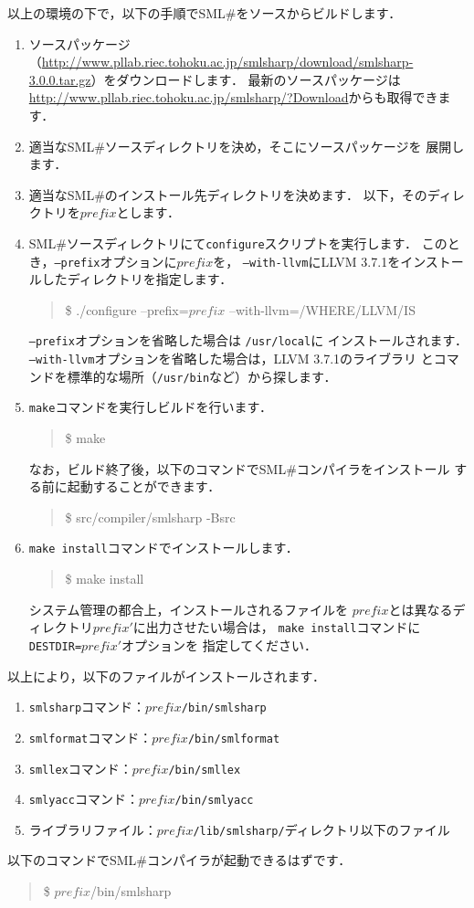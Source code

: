 \documentclass{jbook}
\newcommand{\smlsharp}{SML\#}
\newcommand{\version}{3.0.0}
\newcommand\eurl[1]{{\edef\eurlTMP{{#1}}\expandafter\url\eurlTMP}}
\newenvironment{program}{\begin{quote}\begin{tt}}%
                        {\end{tt}\end{quote}}
\begin{document}
	以上の環境の下で，以下の手順で\smlsharp{}をソースからビルドします．
\begin{enumerate}
\item
	ソースパッケージ（\eurl{http://www.pllab.riec.tohoku.ac.jp/smlsharp/download/smlsharp-\version.tar.gz}）をダウンロードします．
	最新のソースパッケージは
\url{http://www.pllab.riec.tohoku.ac.jp/smlsharp/?Download}からも取得できます．
\item 適当な\smlsharp{}ソースディレクトリを決め，そこにソースパッケージを
展開します．
\item 適当な\smlsharp{}のインストール先ディレクトリを決めます．
	以下，そのディレクトリを$\mathit{prefix}$とします．
\item
	\smlsharp{}ソースディレクトリにて{\tt configure}スクリプトを実行します．
	このとき，{\tt --prefix}オプションに$\mathit{prefix}$を，
{\tt --with-llvm}にLLVM 3.7.1をインストールしたディレクトリを指定します．
\begin{program}
\$ ./configure --prefix=$\mathit{prefix}$ --with-llvm=/WHERE/LLVM/IS
\end{program}
	{\tt --prefix}オプションを省略した場合は {\tt /usr/local}に
インストールされます．
	{\tt --with-llvm}オプションを省略した場合は，LLVM 3.7.1のライブラリ
とコマンドを標準的な場所（{\tt /usr/bin}など）から探します．
\item
	{\tt make}コマンドを実行しビルドを行います．
\begin{program}
\$ make
\end{program}
	なお，ビルド終了後，以下のコマンドで\smlsharp{}コンパイラをインストール
する前に起動することができます．
\begin{program}
\$ src/compiler/smlsharp -Bsrc
\end{program}
\item
	{\tt make install}コマンドでインストールします．
\begin{program}
\$ make install
\end{program}
	システム管理の都合上，インストールされるファイルを
$\mathit{prefix}$とは異なるディレクトリ$\mathit{prefix}'$に出力させたい場合は，
{\tt make install}コマンドに{\tt DESTDIR=$\mathit{prefix}'$}オプションを
指定してください．
\end{enumerate}

	以上により，以下のファイルがインストールされます．
\begin{enumerate}
\item {\tt smlsharp}コマンド：{\tt $\mathit{prefix}$/bin/smlsharp}
\item {\tt smlformat}コマンド：{\tt $\mathit{prefix}$/bin/smlformat}
\item {\tt smllex}コマンド：{\tt $\mathit{prefix}$/bin/smllex}
\item {\tt smlyacc}コマンド：{\tt $\mathit{prefix}$/bin/smlyacc}
\item ライブラリファイル：{\tt $\mathit{prefix}$/lib/smlsharp/}ディレクトリ以下のファイル
\end{enumerate}
以下のコマンドで\smlsharp{}コンパイラが起動できるはずです．
\begin{program}
\$ $\mathit{prefix}$/bin/smlsharp
\end{program}
\end{document}
